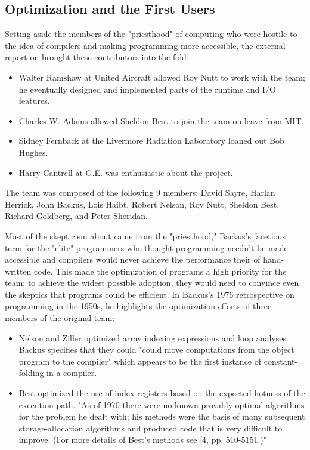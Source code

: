 \subsection{\FTN{} Optimization and the First Users}

Setting aside the members of the "priesthood" of computing who were hostile to
the idea of compilers and making programming more accessible, the external
report on \FTN{} brought these contributors into the fold:
\begin{itemize}
	\item Walter Ramshaw at United Aircraft allowed Roy Nutt to work
	      with the team; he
	      eventually designed and implemented parts of the runtime and I/O features.
	\item Charles W. Adams allowed Sheldon Best to join the team on
	      leave from MIT.
	\item Sidney Fernback at the Livermore Radiation Laboratory loaned
	      out Bob Hughes.
	\item Harry Cantrell at G.E. was enthusiastic about the project.
\end{itemize}

The team was composed of the following 9 members: David Sayre, Harlan Herrick,
John Backus, Lois Haibt, Robert Nelson, Roy Nutt, Sheldon Best, Richard
Goldberg, and Peter Sheridan.

Most of the skepticism about \FTN{} came from the "priesthood," Backus's
facetious term for the "elite" programmers who thought programming needn't be
made accessible and compilers would never achieve the performance their of
hand-written code. This made the optimization of \FTN{} programs a high
priority for the team; to achieve the widest possible adoption, they would need
to convince even the skeptics that \FTN{} programs could be efficient. In
Backus's 1976 retrospective on programming in the
1950s\cite{Backus_1980_Programming_in_America_in_1950s}, he highlights the
optimization efforts of three members of the original team:

\begin{itemize}
	\item Nelson and Ziller optimized array indexing expressions and
	      loop analyses.
	      Backus specifies that they could "could move computations from the object
	      program to the compiler" which appears to be the first instance of
	      constant-folding in a compiler.
	\item Best optimized the use of index registers based on the
	      expected hotness of the
	      execution path. "As of 1970 there were no known provably optimal
	      algorithms for
	      the problem he dealt with; his methods were the basis of many subsequent
	      storage-allocation algorithms and produced code that is very difficult to
	      improve. (For more details of Best's methods see [4, pp. 510-5151.)"
\end{itemize}


